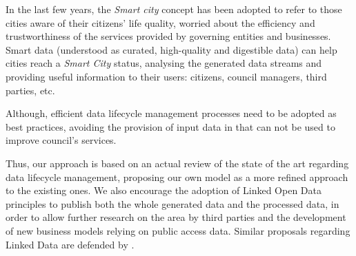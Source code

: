 In the last few years, the \textit{Smart city} concept has been adopted to refer to those cities aware of their citizens' life quality, worried about the efficiency and trustworthiness of the services provided by governing entities and businesses. Smart data (understood as curated, high-quality and digestible data) can help cities reach a \textit{Smart City} status, analysing the generated data streams and providing useful information to their users: citizens, council managers, third parties, etc.

Although, efficient data lifecycle management processes need to be a\-dop\-ted as best practices, avoiding the provision of input data in that can not be used to improve council's services.

Thus, our approach is based on an actual review of the state of the art regarding data lifecycle management, proposing our own model as a more refined approach to the existing ones. We also encourage the adoption of Linked Open Data principles to publish both the whole generated data and the processed data, in order to allow further research on the area by third parties and the development of new business models relying on public access data. Similar proposals regarding Linked Data are defended by \cite{Bizer:2012:MUB:2094114.2094129}.
